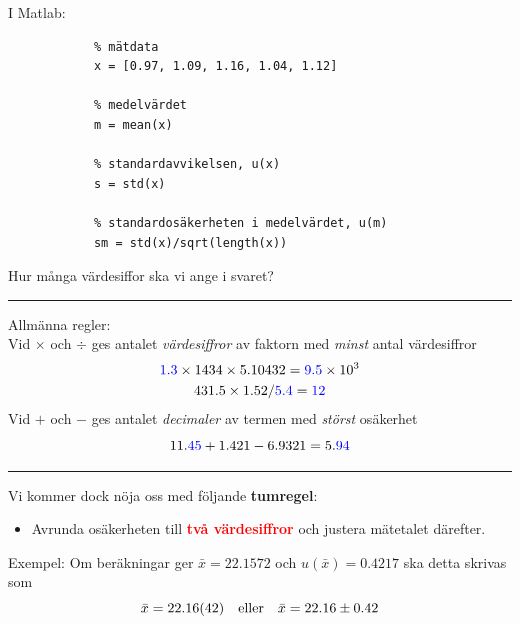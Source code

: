 \documentclass[9pt]{beamer}
\newcommand*\mean[1]{\bar{#1}}
\begin{document}
    \begin{frame}[fragile]
        I Matlab:

        \begin{verbatim}
            % mätdata
            x = [0.97, 1.09, 1.16, 1.04, 1.12]

            % medelvärdet
            m = mean(x)

            % standardavvikelsen, u(x)
            s = std(x)

            % standardosäkerheten i medelvärdet, u(m)
            sm = std(x)/sqrt(length(x))
        \end{verbatim}
    \end{frame}

    \begin{frame}
        Hur många värdesiffor ska vi ange i svaret?

        \vfill

        \hrule\vspace{0.4em}
        Allmänna regler: \\
        Vid $\times$ och $\div$ ges antalet \emph{värdesiffror} av faktorn med \emph{minst} antal värdesiffror
        \begin{gather*}
            \textcolor{blue}{1.3}\times1434\times5.10432 = \textcolor{blue}{9.5}\times10^3\\
            431.5\times1.52 / \textcolor{blue}{5.4} = \textcolor{blue}{12}
        \end{gather*}
        Vid $+$ och $-$ ges antalet \emph{decimaler} av termen med \emph{störst} osäkerhet
        \begin{equation*}
            11.\textcolor{blue}{45} + 1.421 - 6.9321 = 5.\textcolor{blue}{94}
        \end{equation*}
        \hrule

        \vfill

        Vi kommer dock nöja oss med följande \textbf{tumregel}:
        \begin{itemize}
            \item Avrunda osäkerheten till \textcolor{red}{\textbf{två värdesiffror}} och justera mätetalet därefter.
        \end{itemize}

        \vfill
        Exempel: Om beräkningar ger $\mean{x} = 22.1572$ och $u(\mean{x}) = 0.4217$ ska detta skrivas som
                \begin{equation*}
                    \mean{x}=\num{22.16\pm0.42} \quad \text{eller} \quad \mean{x}=\num[separate-uncertainty=true]{22.16\pm0.42}
                \end{equation*}
    \end{frame}
\end{document}
